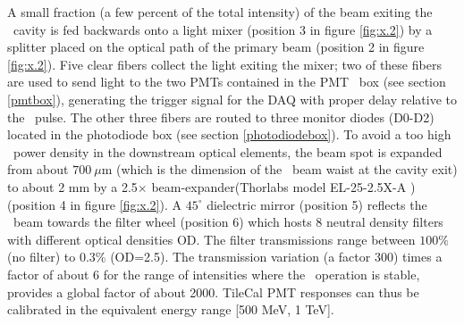 A small fraction (a few percent of the total intensity) of the beam exiting the \laser~cavity is fed backwards onto a light mixer (position 3 in figure 
\ref{fig:x.2}) by a splitter placed on the optical path of the primary beam
(position 2 in figure \ref{fig:x.2}). Five clear fibers collect the light exiting
the mixer; two of these fibers are used to send light to the two PMTs contained in the PMT
~box (see section \ref{pmtbox}), generating the trigger signal for the DAQ with proper delay
relative to the \laser~pulse. The other three fibers are routed to three monitor
diodes (D0-D2) located in the photodiode box (see section \ref{photodiodebox}).  To avoid a too high \laser~power density in the downstream optical elements, the beam spot is expanded from
about $700 ~\mu$m
(which is the dimension of the \laser~beam waist at the cavity exit) to about 2 mm by
a 2.5$\times$ beam-expander(Thorlabs model EL-25-2.5X-A \cite{ref:thorlab}) (position 4 in figure
\ref{fig:x.2}). A $45^{\circ}$ dielectric mirror (position 5) reflects the \laser~beam towards the filter wheel (position 6) which hosts 8 neutral density filters
with different optical densities OD. The filter transmissions range between $100\%$
(no filter) to $0.3\%$ (OD=2.5). The transmission variation (a factor 300) times a
factor of about 6 for the range of intensities where the \laser~operation is stable,
provides a global factor of about 2000. TileCal  PMT responses can thus be calibrated in the
equivalent energy range [500 MeV, 1 TeV].

